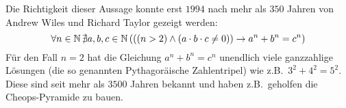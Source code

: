 \setlength{\marginparwidth}{1.7cm}
\begin{example}
Die Richtigkeit dieser Aussage konnte erst $1994$ nach mehr als $350$
Jahren von Andrew Wiles und Richard Taylor gezeigt werden:
\begin{displaymath}
\forall n\in\mathbb N\, \nexists a,b,c \in \mathbb N\, (((n > 2) \wedge
(a \cdot b \cdot c \not= 0)) \rightarrow a^n + b^n
= c^n)  
\end{displaymath}
Für den Fall $n=2$ hat die Gleichung $a^n + b^n
= c^n$ unendlich viele ganzzahlige Lösungen (die so genannten
Pythagoräische Zahlentripel) wie z.B.~$3^2+4^2=5^2$. Diese sind seit 
mehr als $3500$ Jahren bekannt und haben z.B.~geholfen die
Cheops-Pyramide zu bauen.
\end{example}

